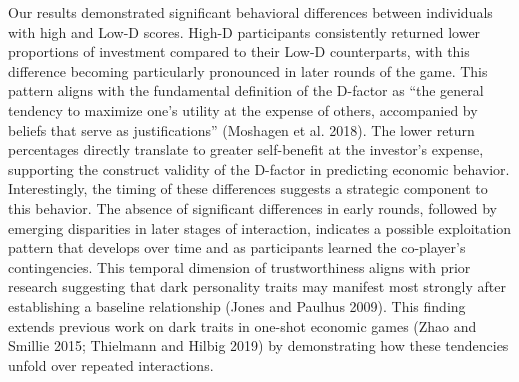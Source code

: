\documentclass[
]{article}
\begin{document}
Our results demonstrated significant behavioral differences between individuals with high and Low-D scores.
High-D participants consistently returned lower proportions of investment compared to their Low-D counterparts, with this difference becoming particularly pronounced in later rounds of the game.
This pattern aligns with the fundamental definition of the D-factor as ``the general tendency to maximize one's utility at the expense of others, accompanied by beliefs that serve as justifications'' (Moshagen et al. 2018).
The lower return percentages directly translate to greater self-benefit at the investor's expense, supporting the construct validity of the D-factor in predicting economic behavior.
Interestingly, the timing of these differences suggests a strategic component to this behavior.
The absence of significant differences in early rounds, followed by emerging disparities in later stages of interaction, indicates a possible exploitation pattern that develops over time and as participants learned the co-player's contingencies.
This temporal dimension of trustworthiness aligns with prior research suggesting that dark personality traits may manifest most strongly after establishing a baseline relationship (Jones and Paulhus 2009).
This finding extends previous work on dark traits in one-shot economic games (Zhao and Smillie 2015; Thielmann and Hilbig 2019) by demonstrating how these tendencies unfold over repeated interactions.
\end{document}
